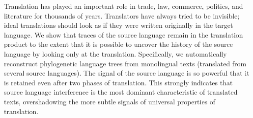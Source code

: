 Translation has played an important role in trade, law, commerce, politics, and literature for thousands of years. Translators have always tried to be invisible; ideal translations should look as if they were written originally in the target language. We show that traces of the source language remain in the translation product to the extent that it is possible to uncover the history of the source language by looking only at the translation. Specifically, we automatically reconstruct phylogenetic language trees from monolingual texts (translated from several source languages). The signal of the source language is so powerful that it is retained even after two phases of translation. This strongly indicates that source language interference is the most dominant characteristic of translated texts, overshadowing the more subtle signals of universal properties of translation.
